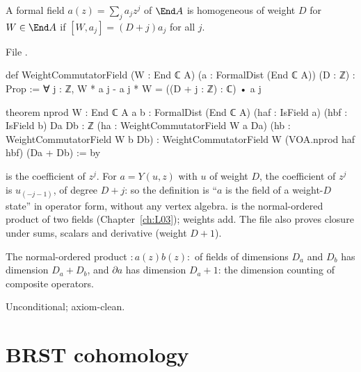 \begin{definition}\label{l04:def:wcf}
A formal field $a(z) = \sum_ja_jz^j$ of $\End A$ is homogeneous of weight $D$ for $W\in\End A$ if
$[W,a_j] = (D+j)a_j$ for all $j$.
\end{definition}
\noindent File .
\begin{leancode}
def WeightCommutatorField (W : End ℂ A) (a : FormalDist (End ℂ A)) (D : ℤ) : Prop :=
  ∀ j : ℤ, W * a j - a j * W = ((D + j : ℤ) : ℂ) • a j

theorem nprod {W : End ℂ A} {a b : FormalDist (End ℂ A)}
    (haf : IsField a) (hbf : IsField b) {Da Db : ℤ}
    (ha : WeightCommutatorField W a Da) (hb : WeightCommutatorField W b Db) :
    WeightCommutatorField W (VOA.nprod haf hbf) (Da + Db) := by
\end{leancode}
\begin{dictionary}
 is the coefficient of $z^j$. For $a = Y(u,z)$ with $u$ of weight $D$, the coefficient of
$z^j$ is $u_{(-j-1)}$, of degree $D+j$: so the definition is ``$a$ is the field of a weight-$D$ state'' in
operator form, without any vertex algebra.  is the normal-ordered product of two
fields (Chapter~\ref{ch:L03}); weights add. The file also proves closure under sums, scalars and
derivative (weight $D+1$).
\end{dictionary}
\begin{physics}
The normal-ordered product $:\!a(z)b(z)\!:$ of fields of dimensions $D_a$ and $D_b$ has dimension
$D_a+D_b$, and $\partial a$ has dimension $D_a+1$: the dimension counting of composite operators.
\end{physics}
\begin{status}
Unconditional; axiom-clean.
\end{status}

\section{BRST cohomology}\label{l04:sec:brst}

